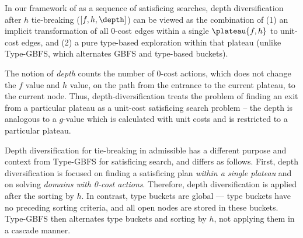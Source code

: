 
In our framework of \astar as a sequence of satisficing searches, depth diversification after $h$ tie-breaking ($[f,h,\depth]$) can be viewed as the combination of (1) an implicit transformation of all 0-cost edges within a single $\plateau{f,h}$ to unit-cost edges, and (2) a pure type-based exploration within that plateau (unlike Type-GBFS, which alternates GBFS and type-based buckets).
 
The notion of \emph{depth} counts the number of 0-cost actions, which does not change the $f$ value and $h$
value, on the path from the entrance to the current plateau, to the current node.  Thus, 
depth-diversification treats  the problem of finding an exit from a particular plateau as a unit-cost satisficing search problem
-- the depth is analogous to a $g$-value which is calculated with unit costs and is restricted to a particular plateau.

Depth diversification for tie-breaking in admissible \astar has a different purpose and context from Type-GBFS for satisficing search,
and differs as follows.
First, depth diversification  is focused on finding a satisficing plan \emph{within a single plateau} and on solving \emph{domains with 0-cost actions}.
Therefore, depth diversification is applied after the sorting by $h$.
In contrast, type buckets are global --- type buckets have no preceding sorting criteria, and all open nodes are stored in these buckets. Type-GBFS then alternates type buckets and sorting by $h$, not applying them in a cascade manner.

